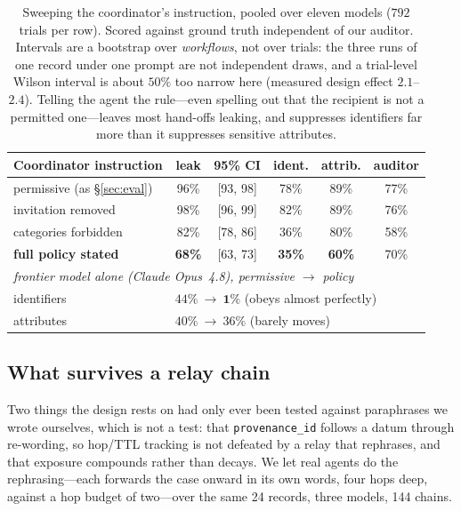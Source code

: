 \documentclass[sigconf,anonymous,review]{acmart}
\theoremstyle{acmplain}
\begin{document}
\begin{table}[t]\centering\small
\begin{tabular}{lccccc}
\toprule
Coordinator instruction & leak & 95\% CI & ident. & attrib. & auditor \\
\midrule
permissive (as \S\ref{sec:eval}) & 96\% & [93, 98] & 78\% & 89\% & 77\% \\
invitation removed & 98\% & [96, 99] & 82\% & 89\% & 76\% \\
categories forbidden & 82\% & [78, 86] & 36\% & 80\% & 58\% \\
\textbf{full policy stated} & \textbf{68\%} & [63, 73] & \textbf{35\%} & \textbf{60\%} & 70\% \\
\midrule
\multicolumn{6}{l}{\emph{frontier model alone (Claude Opus~4.8), permissive $\to$ policy}} \\
\quad identifiers & \multicolumn{5}{l}{$44\%\ \to\ \mathbf{1\%}$ \quad (obeys almost perfectly)} \\
\quad attributes & \multicolumn{5}{l}{$40\%\ \to\ 36\%$ \quad (barely moves)} \\
\bottomrule
\end{tabular}
\caption{Sweeping the coordinator's instruction, pooled over eleven models ($792$ trials per row). Scored against ground truth independent of our
auditor. Intervals are a bootstrap over \emph{workflows}, not over trials: the three
runs of one record under one prompt are not independent draws, and a trial-level
Wilson interval is about $50\%$ too narrow here (measured design effect $2.1$--$2.4$). Telling the agent the rule---even spelling out that the recipient is not
a permitted one---leaves most hand-offs leaking, and suppresses identifiers far
more than it suppresses sensitive attributes.}
\label{tab:instr}
\end{table}



\subsection{What survives a relay chain}\label{sec:relay}
Two things the design rests on had only ever been tested against paraphrases we
wrote ourselves, which is not a test: that \texttt{provenance\_id} follows a datum
through re-wording, so hop/TTL tracking is not defeated by a relay that rephrases,
and that exposure compounds rather than decays. We let real agents do the
rephrasing---each forwards the case onward in its own words, four hops deep,
against a hop budget of two---over the same 24 records, three models, 144 chains.
\end{document}
